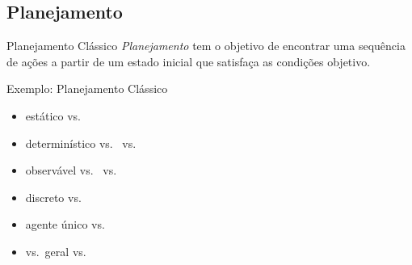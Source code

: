 \documentclass{beamer}
\begin{document}
\subsection{Planejamento}
\begin{frame}{Planejamento Clássico}
\emph{Planejamento} tem o objetivo de encontrar uma \alert{sequência de ações} a partir de um \alert{estado inicial} que satisfaça as \alert{condições objetivo}.
    \begin{exampleblock}{\strut Exemplo: Planejamento Clássico}
      \begin{itemize}
      \item \alert{estático} vs.\ 
        \pause
      \item \alert{determinístico} vs.\ 
        vs.\ 
        \pause
      \item \alert{observável}
        vs.\ 
        vs.\ 
        \pause
      \item \alert{discreto} vs.\ 
        \pause
      \item \alert{agente único} vs.\ 
      \end{itemize}

      \pause
      \begin{itemize}
      \item {} vs.\ \alert{geral} vs.\ 
      \end{itemize}
    \end{exampleblock}
\end{frame}
\end{document}
